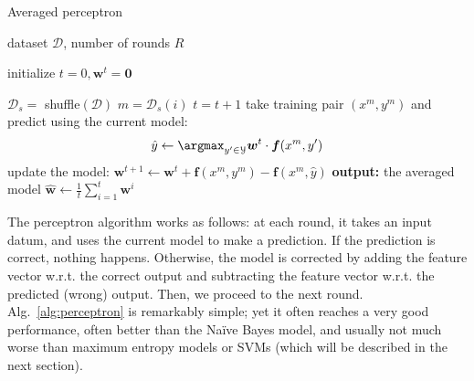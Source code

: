 \begin{algorithm}[t]

   \caption{\label{alg:perceptron} Averaged perceptron}

\begin{algorithmic}[1]

    dataset $\mathcal{D}$, number of rounds $R$

   \STATE initialize $t = 0, \boldsymbol{w}^t = \mathbf{0}$

         \STATE $\mathcal{D}_s =$ shuffle$(\mathcal{D})$
	\STATE $m = \mathcal{D}_s(i)$
        \STATE $t = t+1$
	\STATE take training pair $(x^m, y^m)$ and predict using the current model: 
	$$\hat{y}  \leftarrow \argmax_{y'\in\mathcal{Y}} \boldsymbol{w}^t \cdot \boldsymbol{f}(x^m,y')$$
	\STATE update the model: 
	$\boldsymbol{w}^{t+1} \leftarrow \boldsymbol{w}^{t} +
        \boldsymbol{f}(x^m,y^m) - \boldsymbol{f}(x^m,\hat{y})$
        \ENDFOR
	\ENDFOR
   \STATE \textbf{output:} the averaged model $\hat{\boldsymbol{w}} \leftarrow \frac{1}{t}\sum_{i=1}^{t} \boldsymbol{w}^i$

\end{algorithmic}
 
%
%
%
%
%

\end{algorithm}

The perceptron algorithm works as follows: at each round, it takes an input datum, and uses the current model 
to make a prediction. If the prediction is correct, nothing happens. 
Otherwise, the model is corrected by adding the feature vector w.r.t. the correct output and 
subtracting the  feature vector w.r.t. the predicted (wrong) output. Then, we proceed to the next round. 
Alg.~\ref{alg:perceptron} is remarkably simple; yet it often reaches a very good performance, 
often better than the Na\"ive Bayes model, and usually not much worse than maximum entropy models or SVMs (which will be 
described in the next section). 

